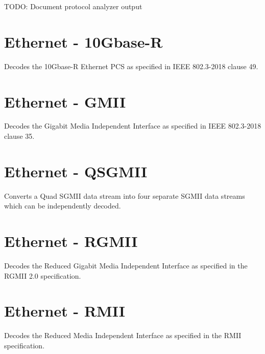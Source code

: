 TODO: Document protocol analyzer output

\pagebreak
\section{Ethernet - 10Gbase-R}
\label{filter:10gbaser}

Decodes the 10Gbase-R Ethernet PCS as specified in IEEE 802.3-2018 clause 49.

\pagebreak
\section{Ethernet - GMII}

Decodes the Gigabit Media Independent Interface as specified in IEEE 802.3-2018 clause 35.

\pagebreak
\section{Ethernet - QSGMII}
\label{filter:qsgmii}

Converts a Quad SGMII data stream into four separate SGMII data streams which can be independently decoded.

\pagebreak
\section{Ethernet - RGMII}

Decodes the Reduced Gigabit Media Independent Interface as specified in the RGMII 2.0 specification.

\pagebreak
\section{Ethernet - RMII}

Decodes the Reduced Media Independent Interface as specified in the RMII specification.

